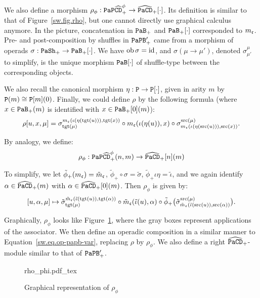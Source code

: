 We also define a morphism $\rho_{\phi} : \mathtt{PaP}\widehat{\mathtt{CD}}_{+}^{\phi} \to \widehat{\mathtt{PaCD}}_{+}[\cdot]$.
Its definition is similar to that of Figure~\ref{sw.fig.rho}, but one cannot directly use graphical calculus anymore.
In the picture, concatenation in $\mathtt{PaB}_{+}$ and $\mathtt{PaB}_{+}[\cdot]$ corresponded to $m_{\mathfrak{c}}$.
 Pre- and post-composition by shuffles in $\mathtt{PaPB}'_{+}$ came from a morphism of operads $\sigma : \mathtt{PaSh}_{+} \to \mathtt{PaB}_{+}[\cdot]$.
We have $\operatorname{ob}\sigma = \operatorname{id}$, and $\sigma(\mu \to \mu')$, denoted $\sigma^{\mu}_{\mu'}$ to simplify, is the unique morphism $\mathtt{PaB}[\cdot]$ of shuffle-type between the corresponding objects.

We also recall the canonical morphism $\eta : \mathtt{P} \to \mathtt{P}[\cdot]$, given in arity $m$ by $\mathtt{P}(m) \cong \mathtt{P}[m](0)$.
Finally, we could define $\rho$ by the following formula (where $x \in \mathtt{PaB}_{+}(m)$ is identified with $x \in \mathtt{PaB}_{+}[0](m)$):
\begin{equation}
  \label{sw.eq.def-rho}
  \rho[u,x,\mu] =
  \sigma^{m_{\mathfrak{c}}(\iota(\eta(\operatorname{tgt}(u))),
    \operatorname{tgt}(x))}_{\operatorname{tgt}(\mu)} \circ
  m_{\mathfrak{c}}(\iota(\eta(u)), x)
  \circ \sigma_{m_{\mathfrak{c}}(\iota(\eta(\operatorname{src}(u))),
    \operatorname{src}(x))}^{\operatorname{src}(\mu)}.
\end{equation}

By analogy, we define:
\[\rho_{\phi} : \mathtt{PaP}\widehat{\mathtt{CD}}_{+}^{\phi}(n,m) \to \widehat{\mathtt{PaCD}}_{+}[n](m) \]

To simplify, we let $\tilde\phi_{+}(m_{\mathfrak{c}}) = \tilde{m}_{\mathfrak{c}}$, $\tilde\phi_{+} \circ \sigma = \tilde\sigma$, $\tilde\phi_{+}\iota\eta = \tilde\iota$, and we again identify $\alpha \in \widehat{\mathtt{PaCD}}_{+}(m)$ with $\alpha \in \widehat{\mathtt{PaCD}}_{+}[0](m)$.
Then $\rho_{\phi}$ is given by:
\[ [u,\alpha,\mu] \mapsto \tilde\sigma^{\tilde{m}_{\mathfrak{c}}(\tilde\iota(\operatorname{tgt}(u)), \operatorname{tgt}(\alpha))}_{\operatorname{tgt}(\mu)} \circ \tilde{m}_{\mathfrak{c}}(\tilde\iota(u), \alpha) \circ \tilde\phi_{+} \bigl( \tilde\sigma_{\tilde{m}_{\mathfrak{c}}(\tilde\iota(\operatorname{src}(u)), \operatorname{src}(\alpha))}^{\operatorname{src}(\mu)} \bigr). \]

Graphically, $\rho_{\phi}$ looks like Figure~\ref{sw.fig.rho-phi}, where the gray boxes represent applications of the associator.
We then define an operadic composition in a similar manner to Equation~\eqref{sw.eq.op-papb-var}, replacing $\rho$ by $\rho_{\phi}$.
We also define a right $\widehat{\mathtt{PaCD}}_{+}$-module similar to that of $\mathtt{PaPB}'_{+}$.

\begin{figure}[htb]
  \centering
  \def\svgwidth{0.35\textwidth} {rho_phi.pdf_tex}
  \caption{Graphical representation of $\rho_\phi$}
  \label{sw.fig.rho-phi}
\end{figure}

